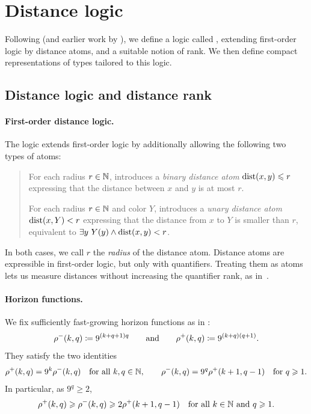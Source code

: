 \section{Distance logic}\label{sec:dist-rank}

Following \cite{mw-arxiv,mw-stoc} (and earlier work by \cite{gks}),
we define a logic called \distFO, extending first-order logic by distance atoms, and a suitable notion of rank. We then define compact representations of types tailored to this logic.

\subsection{Distance logic and distance rank}

\paragraph{First-order distance logic.}
The logic \distFO extends first-order logic by additionally allowing the following two types of atoms:
\begin{quote}
     For each radius \(r \in \mathbb N\), \distFO introduces
        a \emph{binary distance atom} \(\mathrm{dist}(x,y) \leqslant r\) expressing that the distance between \(x\) and \(y\) is at most \(r\).

     For each radius \(r \in \mathbb N\) and color \(Y\), \distFO introduces
        a \emph{unary distance atom} \({\mathrm{dist}(x,Y) < r}\) expressing that the distance from \(x\) to \(Y\) is smaller than \(r\),
        equivalent to \({\exists y~Y(y) \land \mathrm{dist}(x,y) < r}\).
\end{quote}
In both cases, we call \(r\) the \emph{radius} of the distance atom.
Distance atoms are expressible in first-order logic, but only with quantifiers.
Treating them as atoms lets us measure distances without increasing the quantifier rank, as in~\cite{gks}.


\paragraph{Horizon functions.}
We fix sufficiently fast-growing horizon functions as in \cite{locality-note}:
\begin{equation}\label{eq:horizon-def}
\rho^-(k,q)\coloneqq 9^{(k+q+1)q}
\qquad\text{and}\qquad
\rho^+(k,q)\coloneqq 9^{(k+q)(q+1)}.
\end{equation}
They satisfy the two identities
\begin{equation}\label{eq:horizon}
\rho^+(k,q)=9^k\rho^-(k,q)\quad\text{for all $k,q\in\mathbb N$},
\qquad
\rho^-(k,q)=9^q\rho^+(k+1,q-1)\quad\text{for $q\geqslant1$}.
\end{equation}
In particular, as $9^q\ge2$,
\begin{equation}\label{eq:horizon-cons}
\rho^+(k,q)\geqslant\rho^-(k,q)\geqslant2\rho^+(k+1,q-1)\quad\text{for all $k\in\mathbb N$ and $q\geqslant1$}.
\end{equation}


